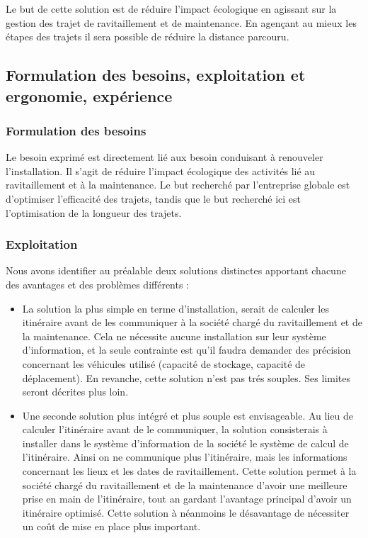         Le but de cette solution est de réduire l'impact écologique en agissant sur la gestion des trajet de ravitaillement et de maintenance. En agençant au mieux les étapes des trajets il sera possible de réduire la distance parcouru.
        
    \subsection{Formulation des besoins, exploitation et ergonomie, expérience}
    
        \subsubsection{Formulation des besoins}
            
            Le besoin exprimé est directement lié aux besoin conduisant à renouveler l'installation. Il s'agit de réduire l'impact écologique des activités lié au ravitaillement et à la maintenance. Le but recherché par l'entreprise globale est d'optimiser l'efficacité des trajets, tandis que le but recherché ici est l'optimisation de la longueur des trajets.
            
        \subsubsection{Exploitation}
        
            Nous avons identifier au préalable deux solutions distinctes apportant chacune des avantages et des problèmes différents :
            \begin{itemize}
                \item La solution la plus simple en terme d'installation, serait de calculer les itinéraire avant de les communiquer à la société chargé du ravitaillement et de la maintenance. Cela ne nécessite aucune installation sur leur système d'information, et la seule contrainte est qu'il faudra demander des précision concernant les véhicules utilisé (capacité de stockage, capacité de déplacement).
                En revanche, cette solution n'est pas trés souples. Ses limites seront décrites plus loin.

                \item Une seconde solution plus intégré et plus souple est envisageable. Au lieu de calculer l'itinéraire avant de le communiquer, la solution consisterais à installer dans le système d'information de la société le système de calcul de l'itinéraire.
                Ainsi on ne communique plus l'itinéraire, mais les informations concernant les lieux et les dates de ravitaillement.
                Cette solution permet à la société chargé du ravitaillement et de la maintenance d'avoir une meilleure prise en main de l'itinéraire, tout an gardant l'avantage principal d'avoir un itinéraire optimisé.
                Cette solution à néanmoins le désavantage de nécessiter un coût de mise en place plus important.
            \end{itemize}
        
